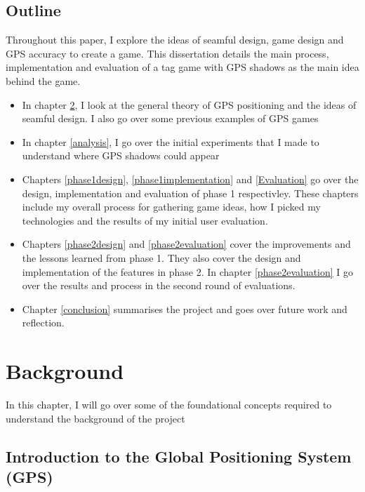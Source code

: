 \documentclass{l4proj}
\begin{document}
\section{Outline}
Throughout this paper, I explore the ideas of seamful design,
game design and GPS accuracy to create a game. This dissertation details the 
main process, implementation and evaluation of a tag game with GPS shadows as the
main idea behind the game.

\begin{itemize}
    \item In chapter \ref{background}, I look at the general theory of GPS positioning and the ideas of seamful design. I also go over some previous examples of GPS games
    \item In chapter \ref{analysis}, I go over the initial experiments that I made to understand where GPS shadows could appear
    \item Chapters \ref{phase1design}, \ref{phase1implementation} and \ref{Evaluation} go over the design, implementation and evaluation of phase 1 respectivley. These chapters include my overall process for gathering game ideas, how I picked my technologies and the results of my initial user evaluation.
    \item Chapters \ref{phase2design} and \ref{phase2evaluation} cover the improvements and the lessons learned from phase 1. They also cover the design and implementation of the features in phase 2. In chapter \ref{phase2evaluation} I go over the results and process in the second round of evaluations.
    \item Chapter \ref{conclusion} summarises the project and goes over future work and reflection.
\end{itemize}

\chapter{Background}
\label{background}

In this chapter, I will go over some of the foundational concepts required to understand the background of the project

\section{Introduction to the Global Positioning System (GPS)}
\end{document}
